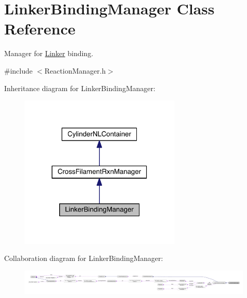 \hypertarget{classLinkerBindingManager}{\section{Linker\+Binding\+Manager Class Reference}
\label{classLinkerBindingManager}
}


Manager for \hyperlink{classLinker}{Linker} binding.  




{\ttfamily \#include $<$Reaction\+Manager.\+h$>$}



Inheritance diagram for Linker\+Binding\+Manager\+:
\nopagebreak
\begin{figure}[H]
\begin{center}
\leavevmode
\includegraphics[width=218pt]{classLinkerBindingManager__inherit__graph}
\end{center}
\end{figure}


Collaboration diagram for Linker\+Binding\+Manager\+:
\nopagebreak
\begin{figure}[H]
\begin{center}
\leavevmode
\includegraphics[width=350pt]{classLinkerBindingManager__coll__graph}
\end{center}
\end{figure}
